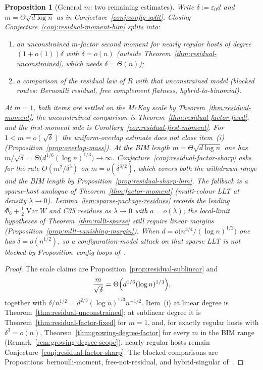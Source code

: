 \documentclass[11pt]{article}
\newtheorem{proposition}[theorem]{Proposition}
\begin{document}
\begin{proposition}[General \(m\): two remaining estimates]
\label{prop:residual-two-gaps}
Write \(\delta:=\varepsilon_0 d\) and \(m=\Theta\sqrt{d\log n}\) as in
Conjecture~\ref{conj:config-split}. Closing Conjecture~\ref{conj:residual-moment-bim}
splits into:
\begin{enumerate}
\item an unconstrained \(m\)-factor second moment for nearly regular hosts of
degree \((1+o(1))\delta\) with \(\delta=o(n)\) (outside
Theorem~\ref{thm:residual-unconstrained}, which needs \(\delta=\Theta(n)\));
\item a comparison of the residual law of \(R\) with that unconstrained model
(blocked routes: Bernoulli residual, free complement flatness, hybrid-to-binomial).
\end{enumerate}
At \(m=1\), both items are settled on the McKay scale by
Theorem~\ref{thm:residual-moment}; the unconstrained comparison is
Theorem~\ref{thm:residual-factor-fixed}, and the first-moment side is
Corollary~\ref{cor:residual-first-moment}.
For \(1<m=o(\sqrt\delta)\) the uniform-overlap estimate does not close
item~(i) (Proposition~\ref{prop:overlap-mass}).
At the BIM length \(m=\Theta\sqrt{d\log n}\) one has
\(m/\sqrt\delta=\Theta\bigl(d^{1/6}(\log n)^{1/3}\bigr)\to\infty\).
Conjecture~\ref{conj:residual-factor-sharp} asks for the rate
\(O(m^2/\delta^3)\) on \(m=o(\delta^{3/2})\), which covers both the withdrawn
range and the BIM length by Proposition~\ref{prop:residual-sharp-bim}.
The fallback is a sparse-host analogue of Theorem~\ref{thm:factor-moment}
(multi-colour LLT at density \(\lambda\to0\)).
Lemma~\ref{lem:sparse-package-residues} records the leading
\(\Phi_6+\tfrac12\operatorname{Var}W\) and C35 residues as \(\lambda\to0\) with
\(a=o(\lambda)\); the local-limit hypotheses of
Theorem~\ref{thm:mllt-sparse} still require linear margins
(Proposition~\ref{prop:mllt-vanishing-margin}).
When \(d=o\bigl(n^{3/4}/(\log n)^{1/2}\bigr)\) one has \(\delta=o(n^{1/2})\), so a
configuration-model attack on that sparse LLT is not blocked by
Proposition~config-loops of~\cite{PlusOneV1}.
\end{proposition}

\begin{proof}
The scale claims are Proposition~\ref{prop:residual-sublinear} and
\[
\frac{m}{\sqrt\delta}
=
\Theta\Bigl(d^{1/6}(\log n)^{1/3}\Bigr),
\]
together with \(\delta/n^{1/2}=d^{2/3}(\log n)^{1/3}n^{-1/2}\).
Item~(i) at linear degree is Theorem~\ref{thm:residual-unconstrained}; at
sublinear degree it is Theorem~\ref{thm:residual-factor-fixed} for \(m=1\),
and, for exactly regular hosts with \(\delta^3=o(n)\),
Theorem~\ref{thm:growing-degree-factor} for every \(m\) in the BIM range
(Remark~\ref{rem:growing-degree-scope}); nearly regular hosts remain
Conjecture~\ref{conj:residual-factor-sharp}.
The blocked comparisons are
Propositions~bernoulli-moment, free-not-residual, and hybrid-singular
of~\cite{PlusOneV1}.
\end{proof}
\end{document}
